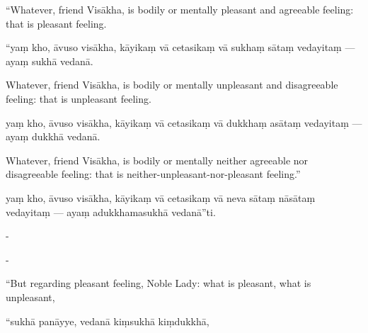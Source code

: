 \begin{samepage}
\begin{leftcolumn*}
“Whatever, friend Visākha, is bodily or mentally pleasant and agreeable feeling: that is pleasant feeling.
\end{leftcolumn*}

\begin{rightcolumn}
“yaṃ kho, āvuso visākha, kāyikaṃ vā cetasikaṃ vā sukhaṃ sātaṃ vedayitaṃ — ayaṃ sukhā vedanā.
\end{rightcolumn}
\end{samepage}

\begin{samepage}
\begin{leftcolumn*}
Whatever, friend Visākha, is bodily or mentally unpleasant and disagreeable feeling: that is unpleasant feeling.
\end{leftcolumn*}

\begin{rightcolumn}
yaṃ kho, āvuso visākha, kāyikaṃ vā cetasikaṃ vā dukkhaṃ asātaṃ vedayitaṃ — ayaṃ dukkhā vedanā.
\end{rightcolumn}
\end{samepage}

\begin{samepage}
\begin{leftcolumn*}
Whatever, friend Visākha, is bodily or mentally neither agreeable nor disagreeable feeling: that is neither-unpleasant-nor-pleasant feeling.”
\end{leftcolumn*}

\begin{rightcolumn}
yaṃ kho, āvuso visākha, kāyikaṃ vā cetasikaṃ vā neva sātaṃ nāsātaṃ vedayitaṃ — ayaṃ adukkhamasukhā vedanā”ti.
\end{rightcolumn}
\end{samepage}

\begin{samepage}
\begin{leftcolumn*}
-
\end{leftcolumn*}

\begin{rightcolumn}
-
\end{rightcolumn}
\end{samepage}

\begin{samepage}
\begin{leftcolumn*}
“But regarding pleasant feeling, Noble Lady: what is pleasant, what is unpleasant,
\end{leftcolumn*}

\begin{rightcolumn}
“sukhā panāyye, vedanā kiṃsukhā kiṃdukkhā,
\end{rightcolumn}
\end{samepage}

